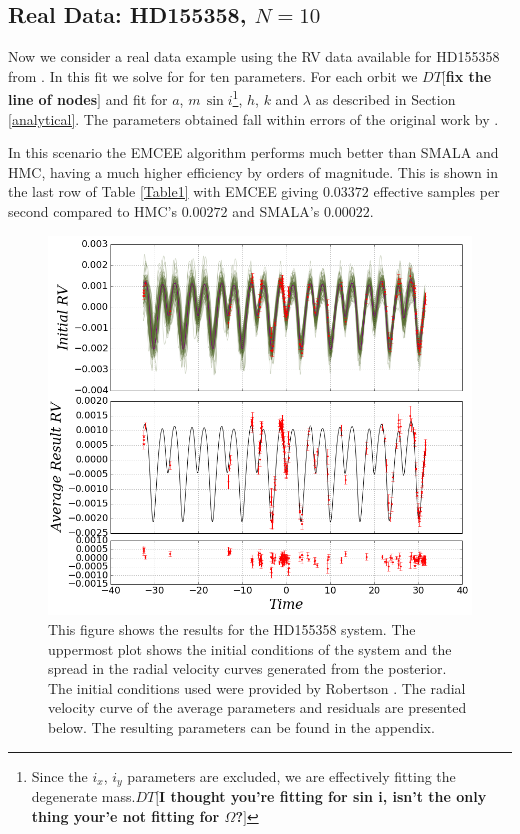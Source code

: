 \documentclass{aa}
\def\memodt#1{\color{green}$DT[${\bf #1}$]$ \color{black}}
\begin{document}
\subsection{Real Data: HD155358, $N=10$}

Now we consider a real data example using the RV data available for HD155358 from \cite{Robertson2012}. 
In this fit we solve for for ten parameters. For each orbit we \memodt{fix the line of nodes} and fit for $a$, $m\, \sin i$\footnote{Since the $i_x$, $i_y$ parameters are excluded, we are effectively fitting the degenerate mass.\memodt{I thought you're fitting for sin i, isn't the only thing your'e not fitting for $\Omega$?}}, $h$, $k$ and $\lambda$ as described in Section \ref{analytical}. 
The parameters obtained fall within errors of the original work by \cite{Robertson2012}.

In this scenario the EMCEE algorithm performs much better than SMALA and HMC, having a much higher efficiency by orders of magnitude. 
This is shown in the last row of Table \ref{Table1} with EMCEE giving $0.03372$ effective samples per second compared to HMC's $0.00272$ and SMALA's $0.00022$.

\begin{figure}
\centering
\includegraphics[width=0.95\hsize]{rv3-1.png}
   \caption{This figure shows the results for the HD155358 system. 
The uppermost plot shows the initial conditions of the system and the spread in the radial velocity curves generated from the posterior. 
The initial conditions used were provided by Robertson \cite{Robertson2012}. 
The radial velocity curve of the average parameters and residuals are presented below. 
The resulting parameters can be found in the appendix.}
      \label{FigHD}
\end{figure}
\end{document}

